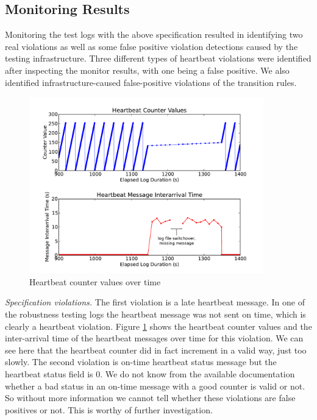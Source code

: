 
\subsection{Monitoring Results}
Monitoring the test logs with the above specification resulted in identifying two real violations as well as some false positive violation detections caused by the testing infrastructure.
%
Three different types of heartbeat violations were identified after inspecting the monitor results, with one being a false positive.
We also identified infrastructure-caused false-positive violations of the transition rules.

\begin{figure}[htbp]
		\centering
		\includegraphics[width=4.0in]{img/hb1}
		\caption{Heartbeat counter values over time}
		\label{fig:hb_arrival}
\end{figure}

\textit{Specification violations.}
The first violation is a late heartbeat message. In one of the robustness testing logs the heartbeat message was not sent on time, which is clearly a heartbeat violation. Figure \ref{fig:hb_arrival} shows the heartbeat counter values and the inter-arrival time of the heartbeat messages over time for this violation. We can see here that the heartbeat counter did in fact increment in a valid way, just too slowly.
The second violation is on-time heartbeat status message but the heartbeat status field is 0.
We do not know from the available documentation whether a bad status in an on-time message with a good counter is valid or not. So without more information we cannot tell whether these violations are false positives or not. This is worthy of further investigation.


